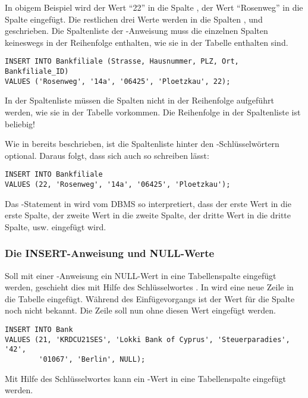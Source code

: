 \clearpage
In obigem Beispiel wird der Wert \enquote{22} in die Spalte
, der Wert \enquote{Rosenweg} in die Spalte
 eingefügt. Die restlichen drei Werte werden in
die Spalten ,  und
 geschrieben.
Die Spaltenliste der \INSERT-Anweisung muss die einzelnen Spalten keineswegs in der Reihenfolge enthalten, wie sie in der Tabelle enthalten sind.
\begin{lstlisting}[language=oracle_sql,caption={Ein einfaches INSERT},label=sql07_03]
INSERT INTO Bankfiliale (Strasse, Hausnummer, PLZ, Ort, Bankfiliale_ID)
VALUES ('Rosenweg', '14a', '06425', 'Ploetzkau', 22);
        \end{lstlisting}
\begin{merke}
    In der Spaltenliste müssen die Spalten nicht in der Reihenfolge
    aufgeführt werden, wie sie in der Tabelle vorkommen. Die Reihenfolge
    in der Spaltenliste ist beliebig!
\end{merke}
\vspace{1em}
Wie in  bereits beschrieben, ist die Spaltenliste
hinter den -Schlüssel\-wörtern optional.
Daraus folgt, dass sich  auch so schreiben lässt:
\begin{lstlisting}[language=oracle_sql,caption={Ein einfaches INSERT ohne Spaltenliste},label=sql07_04]
INSERT INTO Bankfiliale
VALUES (22, 'Rosenweg', '14a', '06425', 'Ploetzkau');
        \end{lstlisting}
Das \INSERT-Statement in  wird vom DBMS so
interpretiert, dass der erste Wert in die erste Spalte, der zweite Wert
in die zweite Spalte, der dritte Wert in die dritte Spalte, usw.
eingefügt wird.
\subsubsection{Die INSERT-Anweisung und NULL-Werte}
Soll mit einer \INSERT-Anweisung ein NULL-Wert in eine Tabellenspalte
eingefügt werden, geschieht dies mit Hilfe des Schlüsselwortes
. In  wird eine neue Zeile in
die Tabelle  eingefügt. Während des
Einfügevorgangs ist der Wert für die Spalte 
noch nicht bekannt. Die Zeile soll nun ohne diesen Wert eingefügt
werden.
\begin{lstlisting}[language=oracle_sql,caption={Ein einfaches \INSERT{} mit \languageorasql{NULL}-Werten},label=sql07_05]
INSERT INTO Bank
VALUES (21, 'KRDCU21SES', 'Lokki Bank of Cyprus', 'Steuerparadies', '42',
        '01067', 'Berlin', NULL);
        \end{lstlisting}
\begin{merke}
    Mit Hilfe des Schlüsselwortes  kann ein
    -Wert in eine Tabellenspalte eingefügt werden.
\end{merke}
